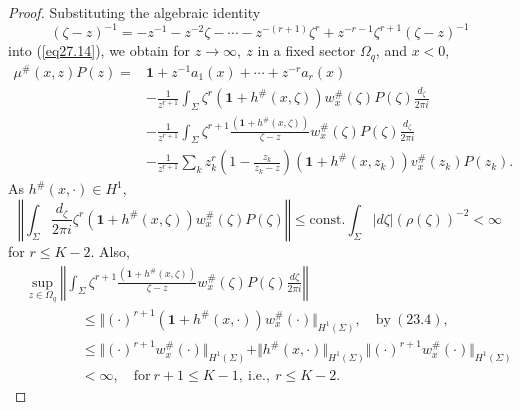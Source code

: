 \documentclass{surv-l}
\theoremstyle{plain}
\theoremstyle{definition}
\numberwithin{equation}{chapter}
\begin{document}
\begin{proof} Substituting the algebraic identity
\begin{equation}\label{eq29.6}
(\zeta-z)^{-1}=-z^{-1}-z^{-2}\zeta-\cdots-z^{-(r+1)}\zeta^{r}+z^{-r-1}\zeta^{r+1}(\zeta-z)^{-1}
\end{equation}
into (\ref{eq27.14}), we obtain for $z\rightarrow\infty,\ z$ in a fixed sector $\Omega_{q}$, and $x<0$,
\begin{align*}
\mu^{\#}(x, z)P(z)=&\mathbf{1}+z^{-1}a_{1}(x)+\cdots+z^{-r}a_{r}(x)\\
&-\frac{1}{z^{r+1}}\int_{\Sigma}\zeta^{r}(\mathbf{1}+h^{\#}(x,\zeta))w_{x}^{\#}(\zeta)P(\zeta)\frac{d_{\zeta}}{2\pi i}\\
&-\frac{1}{z^{r+1}}\int_{\Sigma}\zeta^{r+1}\frac{(\mathbf{1}+h^{\#}(x,\zeta))}{\zeta-z}w_{x}^{\#}(\zeta)P(\zeta)\frac{d_{\zeta}}{2\pi i}\\
&-\frac{1}{z^{r+1}}\sum_{k}z_{k}^{r}\left(1-\frac{z_{k}}{z_{k}-z}\right)(\mathbf{1}+h^{\#}(x, z_{k}))v_{x}^{\#}(z_{k})P(z_{k}).
\end{align*}
As $ h^{\#} (x, \cdot)\in H^{1}$,
\begin{equation*}
\left\Vert\int_{\Sigma}\frac{d_{\zeta}}{2\pi i}\zeta^{r}(\mathbf{1}+h^{\#}(x, \zeta))w_{x}^{\#}(\zeta)P(\zeta)\right\Vert\leq \mathrm{const.} \int_{\Sigma}|d\zeta|(\rho(\zeta))^{-2}<\infty
\end{equation*}
for $r\leq K-2$. Also,
\begin{align*} &\sup_{z\in\Omega_{q}}\left\Vert\int_{\Sigma}\zeta^{r+1}\frac{(\mathbf{1}+h^{\#}(x,\zeta))}{\zeta-z}w_{x}^{\#}(\zeta)P(\zeta)\frac{d{\zeta}}{2\pi i}\right\Vert \\
&\qquad\qquad\leq\Vert(\cdot)^{r+1}(\mathbf{1}+h^{\#}(x, \cdot))w_{x}^{\#} (\cdot)\Vert_{H^{1}(\Sigma)},\quad \mathrm{by}\ (23.4),\\
&\qquad\qquad\leq\Vert(\cdot)^{r+1}w_{x}^{\#}(\cdot)\Vert_{H^{1}(\Sigma)}+\Vert h^{\#}(x, \cdot)\Vert_{H^{1}(\Sigma)}\Vert(\cdot)^{r+1}w_{x}^{\#}(\cdot)\Vert_{H^{1}(\Sigma)}\\
&\qquad\qquad<\infty,\quad \mathrm{for}\ r+1\leq K-1,\ \mathrm{i.e.},\ r\leq K-2.
\end{align*}


\end{proof}
\end{document}
